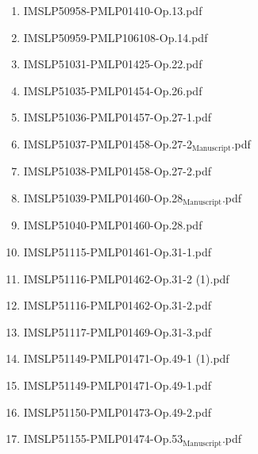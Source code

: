 \documentclass[11pt]{article}
\begin{document}
\begin{enumerate}
\begin{enumerate}
\begin{enumerate}
\item IMSLP50958-PMLP01410-Op.13.pdf
\label{sec-1-1-1-1-44-9-6-8-5}

\item IMSLP50959-PMLP106108-Op.14.pdf
\label{sec-1-1-1-1-44-9-6-8-6}

\item IMSLP51031-PMLP01425-Op.22.pdf
\label{sec-1-1-1-1-44-9-6-8-7}

\item IMSLP51035-PMLP01454-Op.26.pdf
\label{sec-1-1-1-1-44-9-6-8-8}

\item IMSLP51036-PMLP01457-Op.27-1.pdf
\label{sec-1-1-1-1-44-9-6-8-9}

\item IMSLP51037-PMLP01458-Op.27-2$_{\text{Manuscript}}$.pdf
\label{sec-1-1-1-1-44-9-6-8-10}

\item IMSLP51038-PMLP01458-Op.27-2.pdf
\label{sec-1-1-1-1-44-9-6-8-11}

\item IMSLP51039-PMLP01460-Op.28$_{\text{Manuscript}}$.pdf
\label{sec-1-1-1-1-44-9-6-8-12}

\item IMSLP51040-PMLP01460-Op.28.pdf
\label{sec-1-1-1-1-44-9-6-8-13}

\item IMSLP51115-PMLP01461-Op.31-1.pdf
\label{sec-1-1-1-1-44-9-6-8-14}

\item IMSLP51116-PMLP01462-Op.31-2 (1).pdf
\label{sec-1-1-1-1-44-9-6-8-15}

\item IMSLP51116-PMLP01462-Op.31-2.pdf
\label{sec-1-1-1-1-44-9-6-8-16}

\item IMSLP51117-PMLP01469-Op.31-3.pdf
\label{sec-1-1-1-1-44-9-6-8-17}

\item IMSLP51149-PMLP01471-Op.49-1 (1).pdf
\label{sec-1-1-1-1-44-9-6-8-18}

\item IMSLP51149-PMLP01471-Op.49-1.pdf
\label{sec-1-1-1-1-44-9-6-8-19}

\item IMSLP51150-PMLP01473-Op.49-2.pdf
\label{sec-1-1-1-1-44-9-6-8-20}

\item IMSLP51155-PMLP01474-Op.53$_{\text{Manuscript}}$.pdf
\label{sec-1-1-1-1-44-9-6-8-21}


\end{enumerate}
\end{enumerate}
\end{enumerate}
\end{document}
